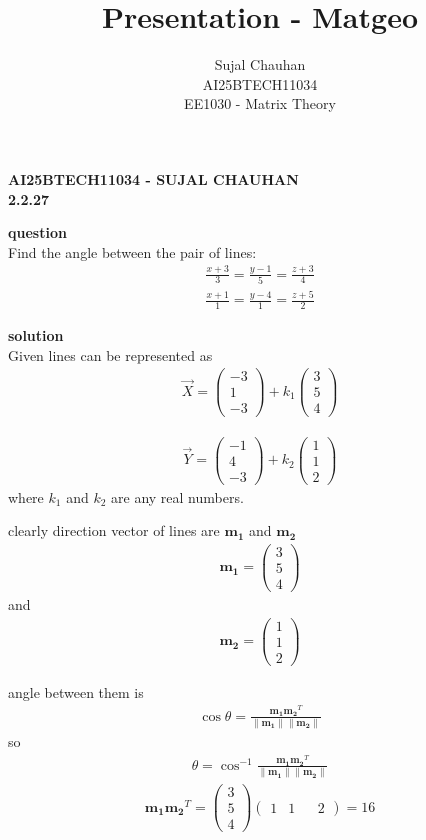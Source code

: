 \documentclass{beamer}
\title{Presentation - Matgeo}
\author{ Sujal Chauhan\\
AI25BTECH11034 \\
EE1030 - Matrix Theory}
\theoremstyle{remark}
\providecommand{\norm}[1]{\lVert#1\rVert}
\newcommand{\myvec}[1]{\ensuremath{\begin{pmatrix}#1\end{pmatrix}}}
\let\vec\mathbf
\numberwithin{equation}{section}
\begin{document}
\begin{frame}
\begin{center}
\textbf{\Large AI25BTECH11034 - SUJAL CHAUHAN }\\
\textbf {2.2.27}
\end{center}

\textbf{question}\\
Find the angle between the pair of lines:\\
\begin{align*}
    \frac{x+3}{3}=\frac{y-1}{5}=\frac{z+3}{4}
\end{align*}
\begin{align*}
    \frac{x+1}{1}=\frac{y-4}{1}=\frac{z+5}{2}
\end{align*}
\end{frame}
\begin{frame}
\textbf{solution}\\
Given lines can be represented as \\
\begin{align}
    \Vec{X}= \myvec{-3 \\ 1 \\-3} + k_1\myvec{3 \\ 5 \\4}    
\end{align}

\begin{align}
    \Vec{Y} = \myvec{-1\\4\\-3} + k_2\myvec{1\\1\\2}
\end{align}
where $k_1$ and $k_2$ are any real numbers.\\
\end{frame}
\begin{frame}
    

clearly direction vector of lines are $\vec{m_1}$ and $\vec{m_2}$
\begin{align}
    \vec{m_1}=\myvec{3\\5\\4} 
\end{align}
and
\begin{align}
     \vec{m_2}=\myvec{1\\1\\2}
\end{align}
\end{frame}
\begin{frame}
angle between them is 
\begin{align}
    \cos{\theta}=\frac{\vec{m_1}\vec{m_2}^T}{\norm{\vec{m_1}}\norm{\vec{m_2}}}
\end{align}
so 
\begin{align}
    \theta=\cos^{-1}{\frac{\vec{m_1}\vec{m_2}^T}{\norm{\vec{m_1}}\norm{\vec{m_2}}}}
\end{align}
\begin{align}
    \vec{m_1}\vec{m_2}^T=\myvec{3 \\ 5 \\ 4}\myvec{1&1&&2}=16
\end{align}
\end{frame}
\end{document}
